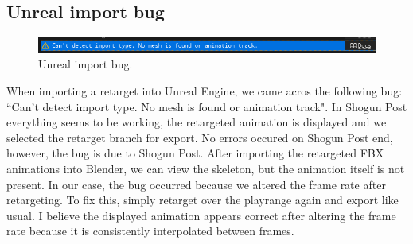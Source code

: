 \documentclass{uva-inf-article}
\begin{document}
\subsection{Unreal import bug}
\begin{figure}[hbt!]
    \centering
    \includegraphics[width=\textwidth]{imgs/UEImportBug.png}
    \caption{Unreal import bug.}
    \label{fig:importBugUE}
\end{figure}
When importing a retarget into Unreal Engine, we came acros the following bug: ``Can't detect import type. No mesh is found or animation track". In Shogun Post everything seems to be working, the retargeted animation is displayed and we selected the retarget branch for export. No errors occured on Shogun Post end, however, the bug is due to Shogun Post. After importing the retargeted FBX animations into Blender, we can view the skeleton, but the animation itself is not present. In our case, the bug occurred because we altered the frame rate after retargeting. To fix this, simply retarget over the playrange again and export like usual. I believe the displayed animation appears correct after altering the frame rate because it is consistently interpolated between frames.



\printbibliography



\end{document}
